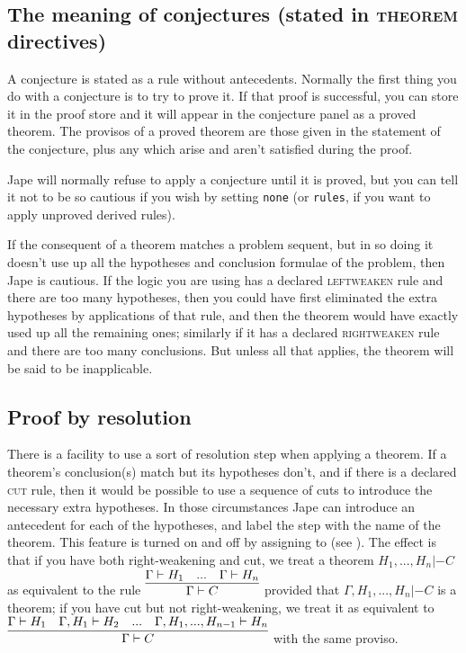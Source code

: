 \subsection{The meaning of conjectures (stated in \textsc{theorem} directives)}

A conjecture is stated as a rule without antecedents. Normally the first thing you do with a conjecture is to try to prove it. If that proof is successful, you can store it in the proof store and it will appear in the conjecture panel as a proved theorem. The provisos of a proved theorem are those given in the statement of the conjecture, plus any which arise and aren't satisfied during the proof.

Jape will normally refuse to apply a conjecture until it is proved, but you can tell it not to be so cautious if you wish by setting  \texttt{none} (or \texttt{rules}, if you want to apply unproved derived rules).

If the consequent of a theorem matches a problem sequent, but in so doing it doesn't use up all the hypotheses and conclusion formulae of the problem, then Jape is cautious. If the logic you are using has a declared \textsc{leftweaken} rule and there are too many hypotheses, then you could have first eliminated the extra hypotheses by applications of that rule, and then the theorem would have exactly used up all the remaining ones; similarly if it has a declared \textsc{rightweaken} rule and there are too many conclusions. But unless all that applies, the theorem will be said to be inapplicable.

\subsection{Proof by resolution}

There is a facility to use a sort of resolution step when applying a theorem. If a theorem's conclusion(s) match but its hypotheses don't, and if there is a declared \textsc{cut} rule, then it would be possible to use a sequence of cuts to introduce the necessary extra hypotheses. In those circumstances Jape can introduce an antecedent for each of the hypotheses, and label the step with the name of the theorem. This feature is turned on and off by assigning to  (see ). The effect is that if you have both right-weakening and cut, we treat a theorem $H_{1},...,H_{n}  |- C$ as equivalent to the rule $\infer{\Gamma  |- C}{\Gamma  |- H_{1} & ... & \Gamma  |- H_{n} } $ provided that $\Gamma,H_{1},...,H_{n}  |- C$ is a theorem; if you have cut but not right-weakening, we treat it as equivalent to $\infer{\Gamma  |- C} {\Gamma  |- H_{1} & \Gamma,H_{1}  |- H_{2} & ... & \Gamma,H_{1},...,H_{n-1}  |- H_{n} }$ with the same proviso.

